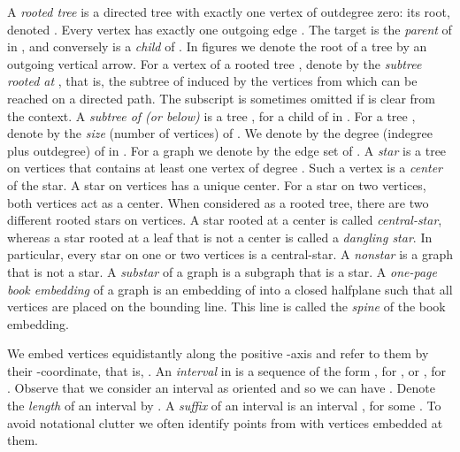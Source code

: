 \documentclass[11pt,a4paper,colorlinks=true,urlcolor=blue,citecolor=red]{article}
\theoremstyle{plain}
\begin{document}
A \emph{rooted tree} is a directed tree  with exactly one vertex of
outdegree zero: its root, denoted . Every vertex  has
exactly one outgoing edge . The target  is the
\emph{parent} of  in , and conversely  is a \emph{child} of
. In figures we denote the root of a tree by an outgoing
vertical arrow. For a vertex  of a rooted tree , denote by
 the \emph{subtree rooted at }, that is, the subtree of 
induced by the vertices from which  can be reached on a directed
path. The subscript is sometimes omitted if  is clear from the
context. A \emph{subtree of (or below) } is a tree , for a
child  of  in . For a tree , denote by  the \emph{size}
(number of vertices) of . We denote by  the degree
(indegree plus outdegree) of  in . For a graph  we denote by
 the edge set of . A \emph{star} is a tree on 
vertices that contains at least one vertex of degree . Such a
vertex is a \emph{center} of the star. A star on  vertices has a
unique center. For a star on two vertices, both vertices act as a
center. When considered as a rooted tree, there are two different rooted
stars on  vertices. A star rooted at a center is called
\emph{central-star}, whereas a star rooted at a leaf
that is not a center is called a \emph{dangling star}. In particular,
every star on one or two vertices is a central-star. A \emph{nonstar} is
a graph that is not a star. A \emph{substar} of a graph is a subgraph
that is a star.
A \emph{one-page book embedding} of a graph  is an embedding of 
into a closed halfplane such that all vertices are placed on the
bounding line. This line is called the \emph{spine} of the book
embedding.

We embed vertices equidistantly along the positive -axis and refer to
them by their -coordinate, that is, . An
\emph{interval}  in  is a sequence of the form
, for , or , for
. Observe that we consider an interval  as
oriented and so we can have . Denote the \emph{length} of an
interval  by .  A \emph{suffix} of an interval
 is an interval , for some . To avoid
notational clutter we often identify points from  with vertices
embedded at them.
\end{document}
